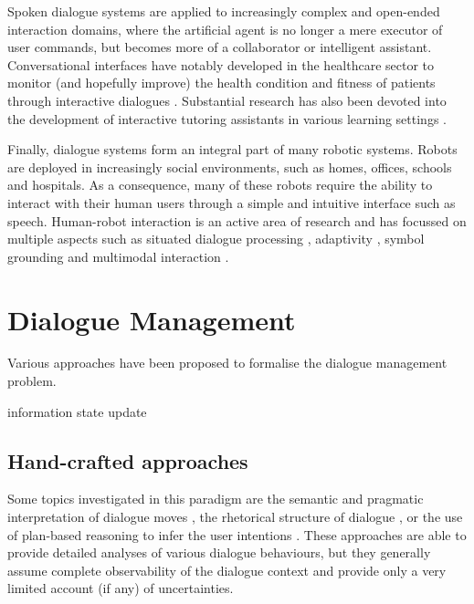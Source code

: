 Spoken dialogue systems are applied to increasingly complex and open-ended interaction domains, where the artificial agent is no longer a mere executor of user commands, but becomes more of a collaborator or intelligent assistant.  Conversational interfaces have notably developed in the healthcare sector to monitor (and hopefully improve) the health condition and fitness of patients through interactive dialogues \citep{BickmoreG06,Stahl:2009,MorbiniFDSTR12}.  Substantial research has also been devoted into the development of interactive tutoring assistants in various learning settings \citep{ChiVLJ11,Dzikovska:2011,jan2011,TraumAAFGKLNS12}. 

Finally, dialogue systems form an integral part of many robotic systems.  Robots are deployed in increasingly social environments, such as homes, offices, schools and hospitals.  As a consequence, many of these robots require the ability to interact with their human users through a simple and intuitive interface such as speech.  Human-robot interaction is an active area of research and has focussed on multiple aspects such as situated dialogue processing \citep{CantrellSSW10,cosybook:dialogue}, adaptivity \citep{DoshiR08}, symbol grounding \citep{Roy05,lemaignan2012} and multimodal interaction \citep{stiefelhagen2004,salem2012,MirnigWSMGBGT13}.

\section{Dialogue Management}
\label{sec:dm}

Various approaches have been proposed to formalise the dialogue management problem.

information state update
\subsection{Hand-crafted approaches}

Some topics investigated in this paradigm are the semantic and pragmatic interpretation of dialogue moves \citep{ThomasonManuscript-THOEUA,Ginzburg2012}, the rhetorical structure of dialogue \citep{0521659515}, or the use of plan-based reasoning to infer the user intentions \citep{Allen1980,Litman87}.  These approaches are able to provide detailed analyses of various dialogue behaviours, but they generally assume complete observability of the dialogue context and provide only a very limited account (if any) of uncertainties.

